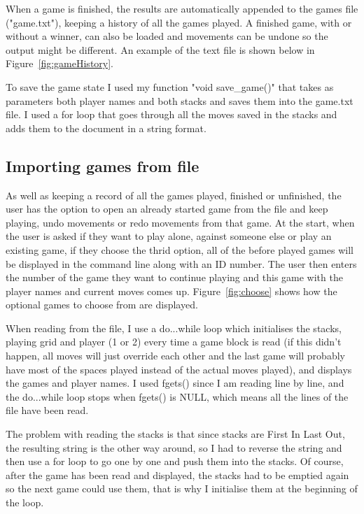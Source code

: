 \documentclass[10pt, a4paper]{article}
\begin{document}
When a game is finished, the results are automatically appended to the games file ("game.txt"), keeping a history of all the games played. A finished game, with or without a winner, can also be loaded and movements can be undone so the output might be different. An example of the text file is shown below in Figure~\ref{fig:gameHistory}.

To save the game state I used my function "void save\_game()" that takes as parameters both player names and both stacks and saves them into the game.txt file. I used a for loop that goes through all the moves saved in the stacks and adds them to the document in a string format.

    \subsection{Importing games from file}

As well as keeping a record of all the games played, finished or unfinished, the user has the option to open an already started game from the file and keep playing, undo movements or redo movements from that game. At the start, when the user is asked if they want to play alone, against someone else or play an existing game, if they choose the thrid option, all of the before played games will be displayed in the command line along with an ID number. The user then enters the number of the game they want to continue playing and this game with the player names and current moves comes up. Figure~\ref{fig:choose} shows how the optional games to choose from are displayed.

When reading from the file, I use a do...while loop which initialises the stacks, playing grid and player (1 or 2) every time a game block is read (if this didn't happen, all moves will just override each other and the last game will probably have most of the spaces played instead of the actual moves played), and displays the games and player names. I used fgets() since I am reading line by line, and the do...while loop stops when fgets() is NULL, which means all the lines of the file have been read.

The problem with reading the stacks is that since stacks are First In Last Out, the resulting string is the other way around, so I had to reverse the string and then use a for loop to go one by one and push them into the stacks. Of course, after the game has been read and displayed, the stacks had to be emptied again so the next game could use them, that is why I initialise them at the beginning of the loop.
\end{document}
